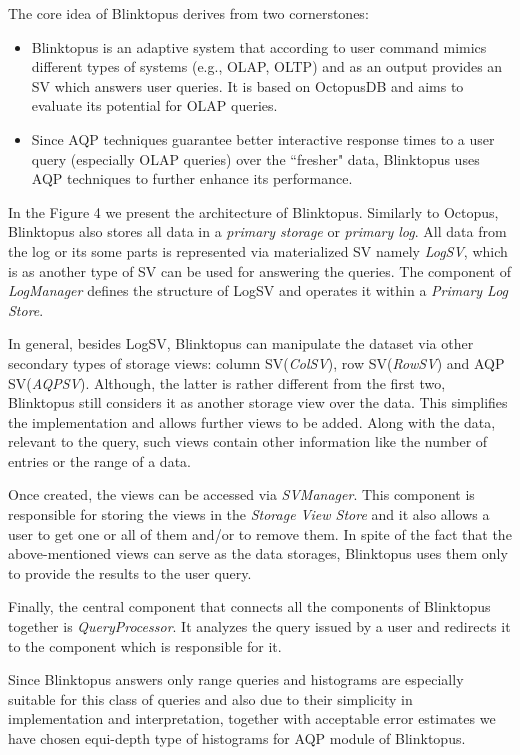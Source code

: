 \documentclass[10pt, conference, compsocconf]{IEEEtran}
\begin{document}
The core idea of Blinktopus derives from two cornerstones:
\begin{itemize}
\item{Blinktopus is an adaptive system that according to user command mimics different types of systems (e.g., OLAP, OLTP) and as an output provides an SV which answers user queries. It is based on OctopusDB and aims to evaluate its potential for OLAP queries.}
\item{Since AQP techniques guarantee better interactive response times to a user query (especially OLAP queries) over the ``fresher" data, Blinktopus uses AQP techniques to further enhance its performance.}
\end{itemize}

In the Figure 4 we present the architecture of Blinktopus. Similarly to Octopus, Blinktopus also stores all data in a \textit{primary storage} or \textit{primary log}.
All data from the log or its some parts is represented via materialized SV namely \textit{LogSV}, which is as another type of SV can be used for answering the queries. The component of \textit{LogManager} defines the structure of LogSV and operates it within a \textit{Primary Log Store}. 

In general, besides LogSV, Blinktopus can manipulate the dataset via other secondary types of storage views: column SV(\textit{ColSV}), row SV(\textit{RowSV}) and AQP SV(\textit{AQPSV}). Although, the latter is rather different from the first two, Blinktopus still considers it as another storage view over the data. This simplifies the implementation and allows further views to be added. Along with the data, relevant to the query, such views contain other information like the number of entries or the range of a data. 

Once created, the views can be accessed via \textit{SVManager}. This component is responsible for storing the views in the \textit{Storage View Store} and it also allows a user to get one or all of them and/or to remove them.
In spite of the fact that the above-mentioned views can serve as the data storages, Blinktopus uses them only to provide the results to the user query. 

Finally, the central component that connects all the components of Blinktopus together is \textit{QueryProcessor}. It analyzes the query issued by a user and redirects it to the component which is responsible for it.

Since Blinktopus answers only range queries and histograms are especially suitable for this class of queries and also due to their simplicity in implementation and interpretation, together with acceptable error estimates we have chosen equi-depth type of histograms for AQP module of Blinktopus. 
\end{document}

